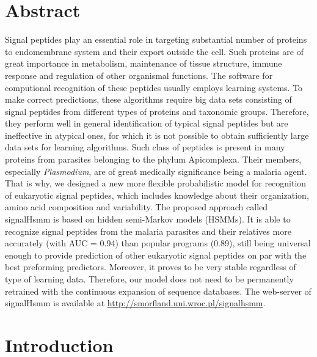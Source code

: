 \documentclass[10pt,letterpaper]{article}
\begin{document}
\section*{Abstract}
Signal peptides play an essential role in targeting substantial number of proteins to endomembrane system and their export outside the cell. Such proteins are of great importance in metabolism, maintenance of tissue structure, immune response and regulation of other organismal functions. The software for computional recognition of these peptides usually employs learning systems. To make correct predictions, these algorithms require big data sets consisting of signal peptides from different types of proteins and taxonomic groups. Therefore, they perform well in general identification of typical signal peptides but are ineffective in atypical ones, for which it is not possible to obtain sufficiently large data sets for  learning algorithms. Such class of peptides is present in many proteins from parasites belonging to the phylum Apicomplexa. Their members, especially \textit{Plasmodium}, are of great medically significance being a malaria agent. That is why, we designed a new more flexible probabilistic model for recognition of eukaryotic signal peptides, which includes knowledge about their organization, amino acid composition and variability. The proposed approach called signalHsmm is based on hidden semi-Markov models (HSMMs). It is able to recognize signal peptides from the malaria parasites and their relatives more accurately (with AUC = 0.94) than popular programs (0.89), still being universal enough to provide prediction of other eukaryotic signal peptides on par with the best preforming predictors. Moreover, it proves to be very stable regardless of type of learning data. Therefore, our model does not need to be permanently retrained with the continuous expansion of sequence databases. The web-server of signalHsmm is available at \url{http://smorfland.uni.wroc.pl/signalhsmm}.




\linenumbers

\section*{Introduction}
\end{document}
